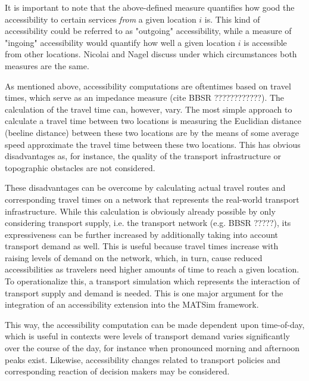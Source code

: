 It is important to note that the above-defined measure quantifies how good the accessibility to certain services \textit{from} a given location $i$ is. This kind of accessibility could be referred to as "outgoing" accessibility, while a measure of "ingoing" accessibility would quantify how well a given location $i$ is accessible from other locations. Nicolai and Nagel \citet{NicolaiNagel2012HiResAccessibilityMethodInBook} discuss under which circumstances both measures are the same.

As mentioned above, accessibility computations are oftentimes based on travel times, which serve as an impedance measure (cite BBSR ????????????). The calculation of the travel time can, however, vary. The most simple approach to calculate a travel time between two locations is measuring the Euclidian distance (beeline distance) between these two locations are by the means of some average speed approximate the travel time between these two locations. This has obvious disadvantages as, for instance, the quality of the transport infrastructure or topographic obstacles are not considered.

These disadvantages can be overcome by calculating actual travel routes and corresponding travel times on a network that represents the real-world transport infrastructure. While this calculation is obviously already possible by only considering transport supply, i.e. the transport network (e.g. BBSR ?????), its expressiveness can be further increased by additionally taking into account transport demand as well. This is useful because travel times increase with raising levels of demand on the network, which, in turn, cause reduced accessibilities as travelers need higher amounts of time to reach a given location. To operationalize this, a transport simulation which represents the interaction of transport supply and demand is needed. This is one major argument for the integration of an accessibility extension into the MATSim framework.

This way, the accessibility computation can be made dependent upon time-of-day, which is useful in contexts were levels of transport demand varies significantly over the course of the day, for instance when pronounced morning and afternoon peaks exist. Likewise, accessibility changes related to transport policies and corresponding reaction of decision makers may be considered.


